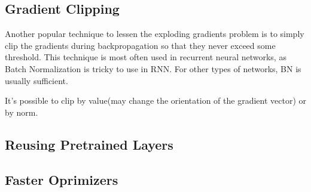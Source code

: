 \documentclass[french]{article}
\begin{document}
\subsection{Gradient Clipping}

Another popular technique to lessen the exploding gradients problem is to simply clip the gradients during backpropagation so that they never exceed some threshold. This technique is most often used in recurrent neural networks, as Batch Normalization is tricky to use in RNN. For other types of networks, BN is usually sufficient.

It's possible to clip by value(may change the orientation of the gradient vector) or by norm.

\subsection{Reusing Pretrained Layers}

\subsection{Faster Oprimizers}
\end{document}
